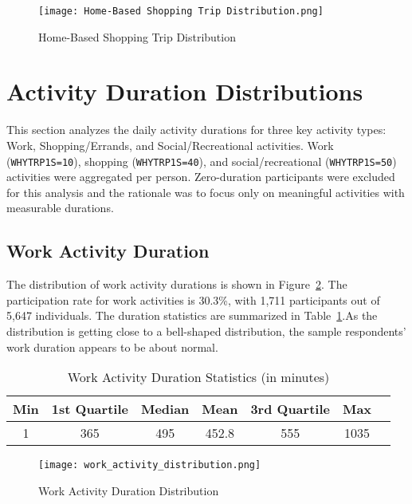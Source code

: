\begin{figure}[h!]
    \centering
    \texttt{[image: Home-Based Shopping Trip Distribution.png]}
    \caption{Home-Based Shopping Trip Distribution}
    \label{fig:Home-Based Shopping Trip Distribution}
\end{figure}



\newpage

\section{Activity Duration Distributions}

This section analyzes the daily activity durations for three key activity types: Work, Shopping/Errands, and Social/Recreational activities. Work (\texttt{WHYTRP1S=10}), shopping (\texttt{WHYTRP1S=40}), and social/recreational (\texttt{WHYTRP1S=50}) activities were aggregated per person. Zero-duration participants were excluded for this analysis and the rationale was to focus only on meaningful activities with measurable durations.

\subsection{Work Activity Duration}
The distribution of work activity durations is shown in Figure~\ref{fig:work_duration}. The participation rate for work activities is 30.3\%, with 1,711 participants out of 5,647 individuals. The duration statistics are summarized in Table~\ref{tab:work_stats}.As the distribution is getting close to a bell-shaped distribution, the sample respondents' work duration appears to be about normal.

\begin{table}[H]
    \centering
    \caption{Work Activity Duration Statistics (in minutes)}
    \label{tab:work_stats}
    \begin{tabular}{@{}ccccccc@{}}
        \toprule
        Min & 1st Quartile & Median & Mean & 3rd Quartile & Max \\ 
        \midrule
        1   & 365          & 495    & 452.8 & 555          & 1035 \\ 
        \bottomrule
    \end{tabular}
\end{table}

\begin{figure}[h!]
    \centering
    \texttt{[image: work\_activity\_distribution.png]}
    \caption{Work Activity Duration Distribution}
    \label{fig:work_duration}
\end{figure}


